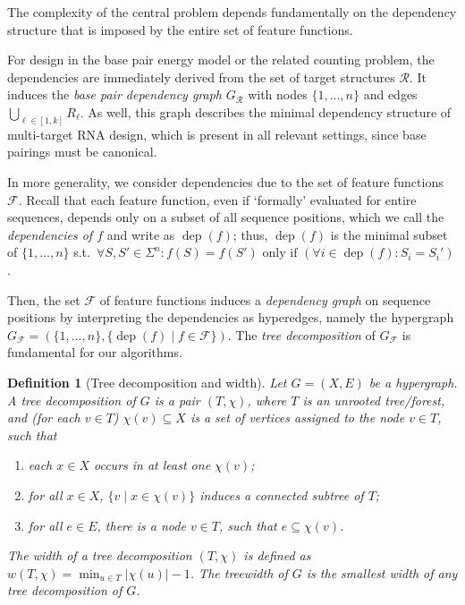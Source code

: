 \documentclass{bmcart}
\newtheorem{definition}[theorem]{Definition}
\newcommand{\dep}{\operatorname{dep}}
\newcommand{\F}{\mathcal{F}}
\newcommand{\R}{\mathcal{R}}
\newcommand{\width}{w}
\newcommand{\Def}[1]{\emph{#1}}
\begin{document}
The complexity of the central problem depends fundamentally on the dependency structure that is imposed by the entire set of feature functions.

For design in the base pair energy model or the related counting problem, the dependencies are immediately derived from the set of target structures 
$\R$. It induces the
\Def{base pair dependency graph} $G_{\R}$ with nodes $\{1,\dots,n\}$
and edges $\bigcup_{\ell\in[1,k]} R_\ell$. As well, this graph describes the minimal
dependency structure of multi-target RNA design, which is present in all relevant settings, since base pairings must be canonical.

In more generality, we consider dependencies due to the set of feature functions $\F$.
Recall that each feature function, even if `formally' evaluated for entire sequences, depends only on a subset of all sequence positions, which we call the \Def{dependencies of $f$} and write as $\dep(f)$;
thus, $\dep(f)$ is the minimal subset of $\{1,\dots,n\}$ s.t.~$\forall S,S'\in\Sigma^n: f(S)=f(S') \text{ only if } (\forall i\in\dep(f): S_i=S_i')$.
  
Then, the set $\F$ of feature functions induces a
  \Def{dependency graph} on sequence positions by interpreting the dependencies as hyperedges, namely the hypergraph 
  $G_\F=(\{1,\dots,n\} ,\{\dep(f)\mid f\in \F\})$. The \Def{tree decomposition} of $G_\F$ is fundamental for our algorithms.

\begin{definition}[Tree decomposition and width]
  \label{def:treedecomp}
  Let $G=(X, E)$ be a hypergraph. A \Def{tree decomposition} of $G$ is
  a pair $(T,\chi)$, where $T$ is an unrooted tree/forest, and (for
  each $v\in T$) $\chi(v)\subseteq X$ is a set of vertices assigned to
  the node $v\in T$, such that
\begin{enumerate}
\item each $x\in X$ occurs in at least one $\chi(v)$;
\item for all $x\in X$, $\{ v \mid x \in \chi(v) \}$ induces a connected subtree of $T$;
\item for all $e\in E$, there is a node $v\in T$, such that $e\subseteq\chi(v)$.
\end{enumerate}
The \Def{width} of a tree decomposition $(T,\chi)$ is defined as
$\width(T,\chi) = \min_{u\in T} |\chi(u)| - 1 $. The \Def{treewidth}
of $G$ is the smallest width of any tree decomposition of $G$.
\end{definition}
\end{document}
